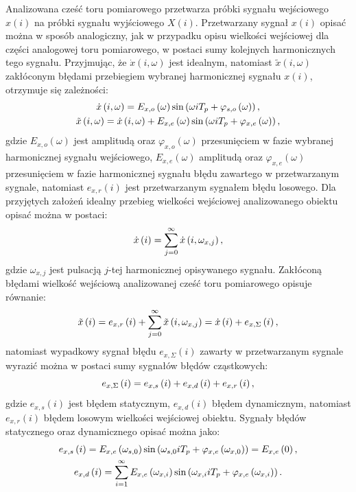 Analizowana cześć toru pomiarowego przetwarza próbki sygnału wejściowego $x(i)$ na próbki sygnału wyjściowego $X(i)$. Przetwarzany sygnał $x(i)$ opisać można w sposób analogiczny, jak w przypadku opisu wielkości wejściowej dla części analogowej toru pomiarowego, w postaci sumy kolejnych harmonicznych tego sygnału. Przyjmując, że $\dot{x}(i, \omega)$ jest idealnym, natomiast $\tilde{x}(i, \omega)$ zakłóconym błędami przebiegiem wybranej harmonicznej sygnału $x(i)$, otrzymuje się zależności:
\begin{gather}
\dot{x} \left( i, \omega \right) = E_{x,o} \left(\omega\right) \sin \left( \omega iT_{p} + \varphi_{s,o} \left(\omega\right) \right) \label{eq:in_disc_omega_ideal}, \\
\tilde{x} \left( i, \omega \right) = \dot{x} \left( i, \omega \right) + E_{x,e} \left(\omega\right) \sin \left( \omega iT_{p} + \varphi_{x,e} \left(\omega\right) \right) \label{eq:in_disc_omega_real},
\end{gather}
gdzie $E_{x,o}(\omega)$ jest amplitudą oraz $\varphi_{x,o}(\omega)$ przesunięciem w fazie wybranej harmonicznej sygnału wejściowego, $E_{x,e}(\omega)$ amplitudą oraz $\varphi_{x,e}(\omega)$ przesunięciem w fazie harmonicznej sygnału błędu zawartego w przetwarzanym sygnale, natomiast $e_{x,r}(i)$ jest przetwarzanym sygnałem błędu losowego. Dla przyjętych założeń idealny przebieg wielkości wejściowej analizowanego obiektu opisać można w postaci:
\begin{equation}
\dot{x} \left(i\right) = \sum _{j = 0} ^{\infty} \dot{x} \left( i, \omega_{x,j} \right) \label{eq:in_disc_sum},
\end{equation}
gdzie $\omega_{x,j}$ jest pulsacją $j$-tej harmonicznej opisywanego sygnału. Zakłóconą błędami wielkość wejściową analizowanej cześć toru pomiarowego opisuje równanie:
\begin{equation}
\tilde{x} \left(i\right) = e_{x,r} \left(i\right) + \sum _{j = 0} ^{\infty} \tilde{x} \left( i, \omega_{x,j} \right) = \dot{x} \left(i\right) + e_{x,\Sigma} \left(i\right) \label{eq:in_disc_real},
\end{equation}
natomiast wypadkowy sygnał błędu $e_{x,\Sigma}(i)$ zawarty w przetwarzanym sygnale wyrazić można w postaci sumy sygnałów błędów cząstkowych:
\begin{equation}
e_{x,\Sigma} \left(i\right) = e_{x,s} \left(i\right) + e_{x,d} \left(i\right) + e_{x,r} \left(i\right) \label{eq:in_disc_err_sum},
\end{equation}
gdzie $e_{x,s}(i)$ jest błędem statycznym, $e_{x,d}(i)$ błędem dynamicznym, natomiast $e_{x,r}(i)$ błędem losowym wielkości wejściowej obiektu. Sygnały błędów statycznego oraz dynamicznego opisać można jako:
\begin{gather}
e_{x,s} \left(i\right) = E_{x,e} \left(\omega_{s,0}\right) \sin \left( \omega_{s,0} iT_{p} + \varphi_{x,e} \left(\omega_{x,0}\right) \right) = E_{x,e} \left(0\right) \label{eq:in_disc_err_stat}, \\
e_{x,d} \left(i\right) = \sum _{i = 1} ^{\infty} E_{x,e} \left(\omega_{x,i}\right) \sin \left( \omega_{x,i} iT_{p} + \varphi_{x,e} \left(\omega_{x,i}\right) \right) \label{eq:in_disc_err_dyn}.
\end{gather}

